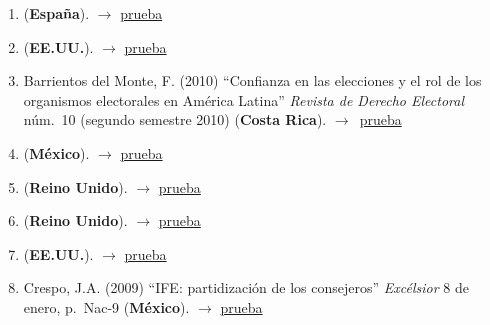 \documentclass[12 pt, letter]{article}
\newenvironment{CitasMiTrabajo}{
    \begin{footnotesize}
    \begin{enumerate}[label={\footnotesize\emph{cita~\arabic*}},ref=\arabic*] %
        \setlength{\itemsep}{.1\itemsep}
        \setlength{\parskip}{.1\parskip}
    }{\end{enumerate}\end{footnotesize}}
\begin{document}
        \begin{CitasMiTrabajo}

        \item {} (\textbf{Espa\~na}). $\rightarrow$ \href{https://books.google.com.mx/books?id=zrlo_6sXG2gC&pg=PA256&lpg=PA256&dq=%5C%C3%ACPartisanship+in+Non-Partisan+Electoral+Agencies+and+Democratic+Compliance:+Evidence+from++Mexico%27s+Federal+Electoral+Institute%5C%C3%AE&source=bl&ots=QCBa2yA3pZ&sig=ppDd9EPaISe61feA5A8TrprbEFY&hl=&redir_esc=y#v=onepage&q=estev&f=false}{prueba}

        \item {} (\textbf{EE.UU.}).  $\rightarrow$ \href{https://github.com/emagar/cv/blob/master/citasMiTrab/estevezEtalElecStud/arevalo2015.pdf}{prueba}

        \item Barrientos del Monte, F. (2010) ``Confianza en las elecciones y el rol de los organismos electorales en Am\'erica Latina'' \emph{Revista de Derecho Electoral} n\'um.\ 10 (segundo semestre 2010) (\textbf{Costa Rica}). $\rightarrow$~\href{https://github.com/emagar/cv/blob/master/citasMiTrab/estevezEtalElecStud/Barrientos.pdf}{prueba}

        \item {} (\textbf{M\'exico}).  $\rightarrow$ \href{https://github.com/emagar/cv/blob/master/citasMiTrab/estevezEtalElecStud/barrientos2011.pdf}{prueba}

        \item {} (\textbf{Reino Unido}).  $\rightarrow$ \href{https://github.com/emagar/cv/blob/master/citasMiTrab/estevezEtalElecStud/birch2011.pdf}{prueba}

        \item {} (\textbf{Reino Unido}).  $\rightarrow$ \href{https://ejpr.onlinelibrary.wiley.com/doi/full/10.1111/1475-6765.12189}{prueba}

        \item {} (\textbf{EE.UU.}).  $\rightarrow$ \href{https://github.com/emagar/cv/blob/master/citasMiTrab/estevezEtalElecStud/bumin2009phd.pdf}{prueba}

        \item Crespo, J.A. (2009)
        ``IFE: partidizaci\'on de los consejeros''
        \emph{Exc\'elsior} 8 de enero, p.\ Nac-9 (\textbf{M\'exico}). $\rightarrow$ \href{https://github.com/emagar/cv/blob/master/citasMiTrab/estevezEtalElecStud/crespo.pdf}{prueba}


\end{CitasMiTrabajo}
\end{document}
